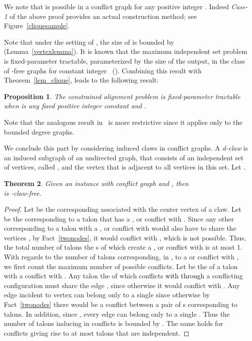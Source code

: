 \documentclass[final]{dmtcs-episciences}
\newtheorem{theorem}{Theorem}
\newtheorem{proposition}[theorem]{Proposition}
\newcommand\mar[1]{\textcolor{black}{#1}}
\begin{document}
We note that  is possible in a conflict graph  
for any positive integer . Indeed  \emph{ Case-1} of the above proof provides
an actual construction method; see Figure~\ref{cliquesample}.


Note that under the setting of , the size of  is bounded by  (Lemma~\ref{vertexlemma}).
It is known that 
the maximum independent set problem is fixed-parameter tractable, parameterized by the size of the 
output, in the class of -free 
graphs for constant integer ~(\citet{DBLP:conf/swat/RamanS06,DabrowskiLMR12}). Combining this result
with Theorem~\ref{lem_clique}, leads to the following result:

\begin{proposition} 
The constrained alignment problem is fixed-parameter tractable when  is any fixed 
positive integer constant and 
. 
\label{cor14}
\end{proposition} 

Note that the analogous result in~\citet{Fertin200990} is more restrictive since it applies only to the bounded degree
graphs.



We conclude this part by considering induced claws in conflict graphs. A  \emph{ d-claw} is an induced subgraph of an undirected graph, 
that consists of an independent set of  vertices, called , and 
the  vertex that is adjacent to all vertices in this set. 
Let .

\begin{theorem}
\label{claw}
Given an instance  with conflict graph  and , then\\  is -claw-free.\end{theorem}

\begin{proof}
Let  be the corresponding  associated with the center vertex of a claw. 
Let  be the  corresponding to a talon that has a ,  or   conflict with . Since 
any other  corresponding to a talon with a ,  or  conflict with  would also 
have to share the vertices , by Fact~\ref{twonodes}, 
it would conflict with , which is not possible. Thus,
the total number of talons the s of which create a ,  or  conflict with 
is at most 1. With regards to the number of talons corresponding, in , to  a   or  
conflict with , we first count the maximum number  of possible  conflicts. 
Let  be the  of a talon with a   conflict with . 
Any talon the  of which conflicts \mar{with}  \mar{through} a  conflicting configuration  must share the 
edge , since otherwise it would conflict with . 
Any  edge incident to vertex  can belong only
to a single  since otherwise by Fact~\ref{twonodes}
there would be a conflict between a pair of s 
corresponding to talons. In addition, since ,
every  edge can belong only to a single . Thus
the number of talons inducing in   conflicts is bounded by
. The same holds for  conflicts
giving rise to at most  talons that 
are independent.
\end{proof}
\end{document}
